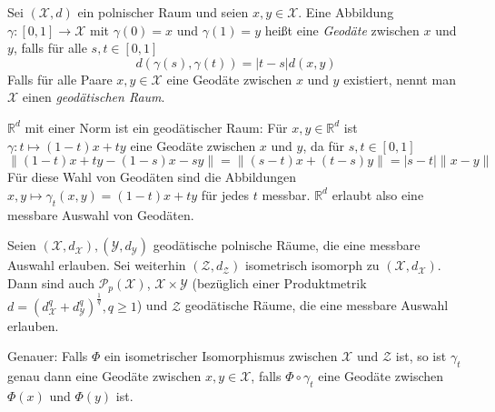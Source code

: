 \begin{definition}[Geodäte]
    Sei $(\mathcal{X},d)$ ein polnischer Raum und seien $x,y\in \mathcal{X}$. Eine Abbildung $\gamma:[0,1]\rightarrow \mathcal{X}$ mit $\gamma(0)=x$ und $\gamma(1)=y$ heißt eine \emph{Geodäte} zwischen $x$ und $y$, falls für alle $s,t \in [0,1]$
    $$d(\gamma(s), \gamma(t)) = |t-s| d(x,y)$$
    Falls für alle Paare $x,y \in \mathcal{X}$ eine Geodäte zwischen $x$ und $y$ existiert, nennt man $\mathcal{X}$ einen \emph{geodätischen Raum}.
\end{definition}
\begin{example}
$\mathbb{R}^d$ mit einer Norm ist ein geodätischer Raum: Für $x,y \in \mathbb{R}^d$ ist $\gamma: t \mapsto (1-t)x + ty$ eine Geodäte zwischen $x$ und $y$, da für $s,t \in [0,1]$
$$\|(1-t)x + ty - (1-s)x - sy \| = \|(s-t)x + (t-s)y\| = |s-t|\|x-y\|$$
Für diese Wahl von Geodäten sind die Abbildungen $x,y \mapsto \gamma_t(x,y)=(1-t)x+ty$ für jedes $t$ messbar. $\mathbb{R}^d$ erlaubt also eine messbare Auswahl von Geodäten.
\end{example}
\begin{lemma}
    Seien $(\mathcal{X}, d_{\mathcal{X}}), (\mathcal{Y}, d_{\mathcal{Y}})$ geodätische polnische Räume, die eine messbare Auswahl erlauben. Sei weiterhin $(\mathcal{Z}, d_{\mathcal{Z}})$ isometrisch isomorph zu $(\mathcal{X}, d_{\mathcal{X}})$. Dann sind auch $\mathcal{P}_p(\mathcal{X})$, $\mathcal{X}\times \mathcal{Y}$ (bezüglich einer Produktmetrik $d = \left(d_\mathcal{X}^q+d_\mathcal{Y}^q\right)^\frac{1}{q}, q\geq 1$) und $\mathcal{Z}$ geodätische Räume, die eine messbare Auswahl erlauben.

    Genauer: Falls $\Phi$ ein isometrischer Isomorphismus zwischen $\mathcal{X}$ und $\mathcal{Z}$ ist, so ist $\gamma_t$ genau dann eine Geodäte zwischen $x,y \in \mathcal{X}$, falls $\Phi \circ \gamma_t$ eine Geodäte zwischen $\Phi(x)$ und $\Phi(y)$ ist.
\end{lemma}
